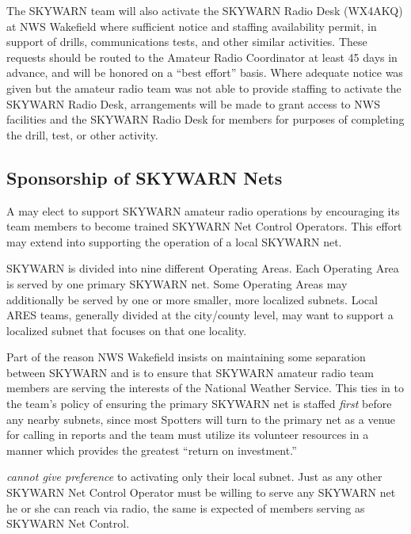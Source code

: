\documentclass[pdflatex,letterpaper,twoside,12pt]{book}
\begin{document}
The SKYWARN team will also activate the SKYWARN Radio Desk (WX4AKQ) at NWS Wakefield where sufficient notice and staffing availability permit, in support of \tpteam drills, communications tests, and other similar activities.  These requests should be routed to the Amateur Radio Coordinator at least 45 days in advance, and will be honored on a ``best effort'' basis.  Where adequate notice was given but the amateur radio team was not able to provide staffing to activate the SKYWARN Radio Desk, arrangements will be made to grant access to NWS facilities and the SKYWARN Radio Desk for \tpteam members for purposes of completing the drill, test, or other activity.


\subsection{\tpteam Sponsorship of SKYWARN Nets}\label{sponsorship-of-nets}

A \tpteam may elect to support SKYWARN amateur radio operations by encouraging its team members to become trained SKYWARN Net Control Operators.  This effort may extend into supporting the operation of a local SKYWARN net.

SKYWARN is divided into nine different Operating Areas.  Each Operating Area is served by one primary SKYWARN net.  Some Operating Areas may additionally be served by one or more smaller, more localized subnets.  Local ARES teams, generally divided at the city/county level, may want to support a localized subnet that focuses on that one locality.

Part of the reason NWS Wakefield insists on maintaining some separation between SKYWARN and \tpteams is to ensure that SKYWARN amateur radio team members are serving the interests of the National Weather Service.  This ties in to the team's policy of ensuring the primary SKYWARN net is staffed \emph{first} before any nearby subnets, since most Spotters will turn to the primary net as a venue for calling in reports and the team must utilize its volunteer resources in a manner which provides the greatest ``return on investment.''

\tpteams \emph{cannot give preference} to activating only their local subnet.  Just as any other SKYWARN Net Control Operator must be willing to serve any SKYWARN net he or she can reach via radio, the same is expected of \tpteam members serving as SKYWARN Net Control.
\end{document}
